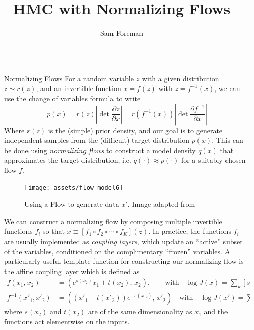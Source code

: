 \documentclass[final]{beamer}
\title{HMC with Normalizing Flows}
\author{Sam Foreman\inst{1}}
\institute[shortinst]{\inst{1} Argonne National Laboratory}
\newlength{\sepwidth}
\newlength{\colwidth}
\newcommand{\separatorcolumn}{\begin{column}{\sepwidth}\end{column}}
\begin{document}
\begin{frame}[t]
\begin{columns}[t]
\separatorcolumn

\begin{column}{\colwidth}

  \begin{block}{Normalizing Flows}
    For a random variable \(z\) with a given distribution \(z \sim r(z)\), and an invertible function \(x = f(z)\) with
    \(z = f^{-1}(x)\), we can use the change of variables formula to write
    \begin{equation}
      p(x) = r(z)\left|\det{\frac{\partial z}{\partial x}}\right|
           = r{(f^{-1}(x))}\left|\det{\frac{\partial f^{-1}}{\partial x}}\right|
    \end{equation}
    Where \(r(z)\) is the (simple) prior density, and our goal is to generate independent samples from the (difficult)
    target distribution \(p(x)\).
    This can be done using \emph{normalizing flows} to construct a model density \(q(x)\) that approximates the target
    distribution, i.e. \(q(\cdot)\approx p(\cdot)\) for a suitably-chosen flow \(f\).
    \begin{figure}%
      \texttt{[image: assets/flow\_model6]}
      \caption{\label{fig:flow_model}Using a Flow to generate data \(x'\). Image adapted from~\cite{weng2018flow}}
    \end{figure}

    We can construct a normalizing flow by composing multiple invertible functions \(f_{i}\) so that \(x\equiv [f_1\circ
    f_{2}\circ \cdots \circ f_{K}](z)\).
    In practice, the functions \(f_{i}\) are usually implemented as \emph{coupling layers}, which update an ``active''
    subset of the variables, conditioned on the complimentary ``frozen'' variables.
    A particularly useful template function for constructing our normalizing flow is the affine coupling layer which is
    defined as 
    \begin{align}
      f(x_{1}, x_{2}) &= \left(e^{s(x_{2})} x_{1} + t(x_{2}),\, x_{2}\right),%
        \quad\quad\text{with}\quad \log J(x) = \sum_{k}[s(x_{2})]_{k} \\
      f^{-1}(x'_{1}, x'_{2}) &= \left((x'_{1}-t(x'_{2}))e^{-s(x'_{2})},\, x'_{2}\right)%
        \quad\text{with}\quad \log J(x') = \sum_{k}-[s(x'_{2})]_{k}
    \end{align}
    where \(s(x_{2})\) and \(t(x_{2})\) are of the same dimensionality as \(x_{1}\) and the functions act elementwise on
    the inputs.


\end{block}
\end{column}
\end{columns}
\end{frame}
\end{document}
